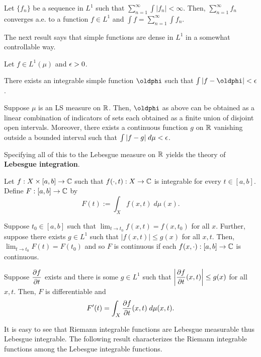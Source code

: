 \documentclass[11pt]{article}
\renewcommand{\phi}{\oldphi}
\newcommand{\llim}{\displaystyle\lim}
\newcommand{\ssum}{\displaystyle\sum}
\begin{document}
\begin{corollary}
Let $\{f_n\}$ be a sequence in $L^1$ such that $\ssum_{n=1}^{\infty}\int|f_n|<\infty$. Then, $\ssum_{n=1}^{\infty}f_n$ converges a.e. to a function $f\in L^1$ and $\int f=\ssum_{n=1}^{\infty}\int f_n$.
\end{corollary}

The next result says that simple functions are dense in $L^1$ in a somewhat controllable way.
\begin{theorem}
Let $f\in L^1(\mu)$ and $\epsilon>0$. 
\begin{enum}{\alph}
\item There exists an integrable simple function $\phi$ such that $\int|f-\phi|<\eps$.

\item Suppose $\mu$ is an LS measure on $\mathbb{R}$. Then, $\phi$ as above can be obtained as a linear combination of indicators of sets each obtained as a finite union of disjoint open intervals. Moreover, there exists a continuous function $g$ on $\mathbb{R}$ vanishing outside a bounded interval such that $\int|f-g|\;d\mu<\epsilon$.
\end{enum}
\end{theorem}

Specifying all of this to the Lebesgue measure on $\mathbb{R}$ yields the theory of \textbf{Lebesgue integration}.

\begin{theorem}
Let $f: X\times[a,b]\to\mathbb{C}$ such that $f(\cdot,t): X\to\mathbb{C}$ is integrable for every $t\in[a,b]$. Define $F: [a,b]\to\mathbb{C}$ by 
$$F(t):=\int_Xf(x,t)\;d\mu(x).$$
\begin{enum}{\alph}
\item Suppose $t_0\in[a,b]$ such that $\llim_{t\to t_0}f(x,t)=f(x,t_0)$ for all $x$. Further, suppose there exists $g\in L^1$ such that $|f(x,t)|\leq g(x)$ for all $x,t$. Then, $\llim_{t\to t_0}F(t)=F(t_0)$ and so $F$ is continuous if each $f(x,\cdot): [a,b]\to\mathbb{C}$ is continuous.

\item Suppose $\dfrac{\partial f}{\partial t}$ exists and there is some $g\in L^1$ such that $\left\lvert\dfrac{\partial f}{\partial t}(x,t)\right\rvert\leq g(x)$ for all $x,t$. Then, $F$ is differentiable and 
$$F'(t)=\int_X\dfrac{\partial f}{\partial t}(x,t)\;d\mu(x,t).$$ 
\end{enum}
\end{theorem}

It is easy to see that Riemann integrable functions are Lebesgue measurable thus Lebesgue integrable. The following result characterizes the Riemann integrable functions among the Lebesgue integrable functions.
\end{document}
